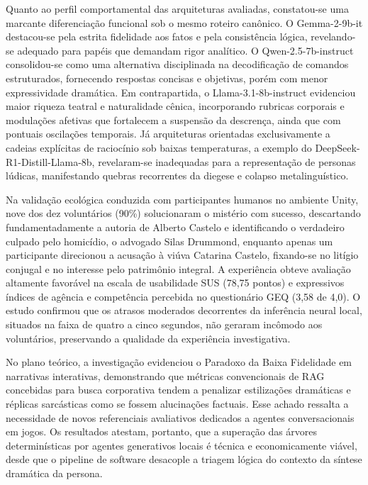 Quanto ao perfil comportamental das arquiteturas avaliadas, constatou-se uma marcante diferenciação funcional sob o mesmo roteiro canônico. O Gemma-2-9b-it destacou-se pela estrita fidelidade aos fatos e pela consistência lógica, revelando-se adequado para papéis que demandam rigor analítico. O Qwen-2.5-7b-instruct consolidou-se como uma alternativa disciplinada na decodificação de comandos estruturados, fornecendo respostas concisas e objetivas, porém com menor expressividade dramática. Em contrapartida, o Llama-3.1-8b-instruct evidenciou maior riqueza teatral e naturalidade cênica, incorporando rubricas corporais e modulações afetivas que fortalecem a suspensão da descrença, ainda que com pontuais oscilações temporais. Já arquiteturas orientadas exclusivamente a cadeias explícitas de raciocínio sob baixas temperaturas, a exemplo do DeepSeek-R1-Distill-Llama-8b, revelaram-se inadequadas para a representação de personas lúdicas, manifestando quebras recorrentes da diegese e colapso metalinguístico.

Na validação ecológica conduzida com participantes humanos no ambiente Unity, nove dos dez voluntários (90\%) solucionaram o mistério com sucesso, descartando fundamentadamente a autoria de Alberto Castelo e identificando o verdadeiro culpado pelo homicídio, o advogado Silas Drummond, enquanto apenas um participante direcionou a acusação à viúva Catarina Castelo, fixando-se no litígio conjugal e no interesse pelo patrimônio integral. A experiência obteve avaliação altamente favorável na escala de usabilidade SUS (78,75 pontos) e expressivos índices de agência e competência percebida no questionário GEQ (3,58 de 4,0). O estudo confirmou que os atrasos moderados decorrentes da inferência neural local, situados na faixa de quatro a cinco segundos, não geraram incômodo aos voluntários, preservando a qualidade da experiência investigativa.

No plano teórico, a investigação evidenciou o Paradoxo da Baixa Fidelidade em narrativas interativas, demonstrando que métricas convencionais de RAG concebidas para busca corporativa tendem a penalizar estilizações dramáticas e réplicas sarcásticas como se fossem alucinações factuais. Esse achado ressalta a necessidade de novos referenciais avaliativos dedicados a agentes conversacionais em jogos. Os resultados atestam, portanto, que a superação das árvores determinísticas por agentes generativos locais é técnica e economicamente viável, desde que o pipeline de software desacople a triagem lógica do contexto da síntese dramática da persona.


